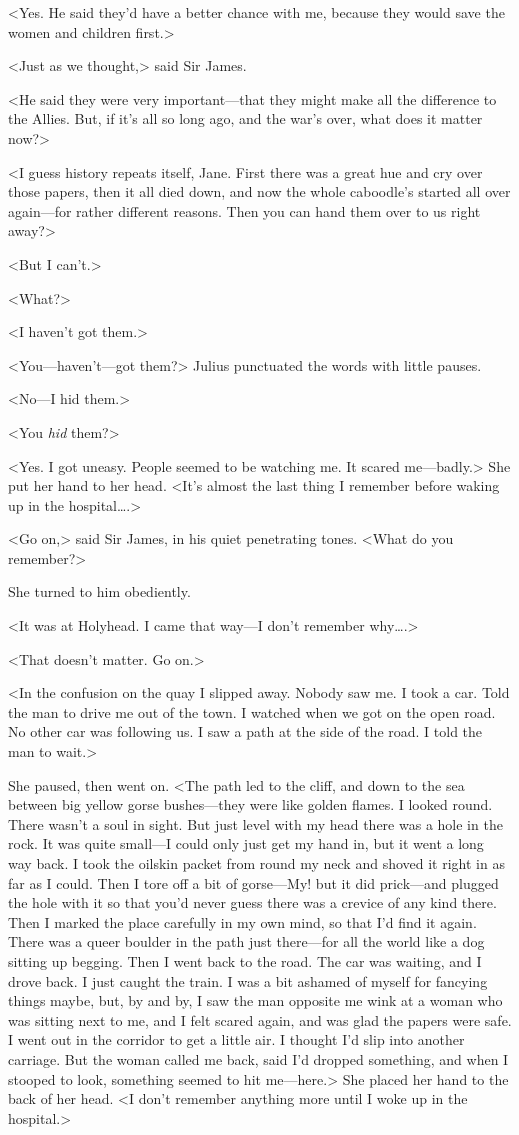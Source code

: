 <Yes. He said they'd have a better chance with me, because they would save the women and children first.>

<Just as we thought,> said Sir James.

<He said they were very important—that they might make all the difference to the Allies. But, if it's all so long ago, and the war's over, what does it matter now?>

<I guess history repeats itself, Jane. First there was a great hue and cry over those papers, then it all died down, and now the whole caboodle's started all over again—for rather different reasons. Then you can hand them over to us right away?>

<But I can't.>

<What?>

<I haven't got them.>

<You—haven't—got them?> Julius punctuated the words with little pauses.

<No—I hid them.>

<You \emph{hid} them?>

<Yes. I got uneasy. People seemed to be watching me. It scared me—badly.> She put her hand to her head. <It's almost the last thing I remember before waking up in the hospital\dots.>

<Go on,> said Sir James, in his quiet penetrating tones. <What do you remember?>

She turned to him obediently.

<It was at Holyhead. I came that way—I don't remember why\dots.>

<That doesn't matter. Go on.>

<In the confusion on the quay I slipped away. Nobody saw me. I took a car. Told the man to drive me out of the town. I watched when we got on the open road. No other car was following us. I saw a path at the side of the road. I told the man to wait.>

She paused, then went on. <The path led to the cliff, and down to the sea between big yellow gorse bushes—they were like golden flames. I looked round. There wasn't a soul in sight. But just level with my head there was a hole in the rock. It was quite small—I could only just get my hand in, but it went a long way back. I took the oilskin packet from round my neck and shoved it right in as far as I could. Then I tore off a bit of gorse—My! but it did prick—and plugged the hole with it so that you'd never guess there was a crevice of any kind there. Then I marked the place carefully in my own mind, so that I'd find it again. There was a queer boulder in the path just there—for all the world like a dog sitting up begging. Then I went back to the road. The car was waiting, and I drove back. I just caught the train. I was a bit ashamed of myself for fancying things maybe, but, by and by, I saw the man opposite me wink at a woman who was sitting next to me, and I felt scared again, and was glad the papers were safe. I went out in the corridor to get a little air. I thought I'd slip into another carriage. But the woman called me back, said I'd dropped something, and when I stooped to look, something seemed to hit me—here.> She placed her hand to the back of her head. <I don't remember anything more until I woke up in the hospital.>


